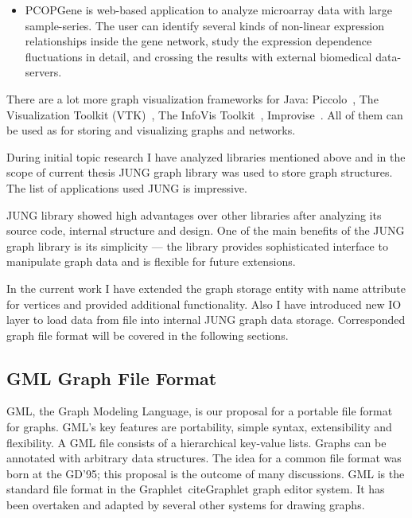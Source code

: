 \begin{enumerate}
\begin{itemize}
\item PCOPGene is web-based application to analyze microarray data with large sample-series. The user can identify several kinds of non-linear expression relationships inside the gene network, study the expression dependence fluctuations in detail, and crossing the results with external biomedical data-servers.~\cite{PCOPGENE}

\end{itemize}

\end{enumerate}

There are a lot more graph visualization frameworks for Java: Piccolo~\cite{Piccolo}, The Visualization Toolkit (VTK)~\cite{VTK}, The InfoVis Toolkit~\cite{InfoVis_Toolkit},
Improvise~\cite{Improvise}. All of them can be used as for storing and visualizing graphs and networks.


During initial topic research I have analyzed libraries mentioned above and in the scope of current thesis JUNG graph library was used to store graph structures.
The list of applications used JUNG is impressive.

JUNG library showed high advantages over other libraries after analyzing its source code, internal structure and design.
One of the main benefits of the JUNG graph library is its simplicity --- the library provides sophisticated interface to manipulate graph data and is flexible for future extensions.

In the current work I have extended the graph storage entity with name attribute for vertices and provided additional functionality. Also I have introduced new IO layer
to load data from file into internal JUNG graph data storage. Corresponded graph file format will be covered in the following sections.

\subsection{GML Graph File Format}
 GML, the Graph Modeling Language, is our proposal for a portable file format for graphs. GML's key features are portability, simple syntax, extensibility and flexibility.
 A GML file consists of a hierarchical key-value lists. Graphs can be annotated with arbitrary data structures.
 The idea for a common file format was born at the GD'95; this proposal is the outcome of many discussions.
 GML is the standard file format in the Graphlet~cite{Graphlet} graph editor system.
 It has been overtaken and adapted by several other systems for drawing graphs.~\cite{GML}


